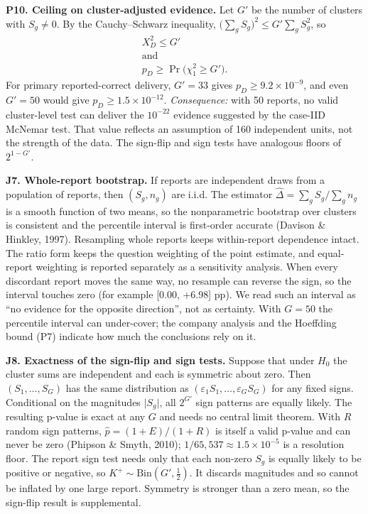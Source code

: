 \documentclass[letterpaper]{article}
\begin{document}
\textbf{P10. Ceiling on cluster-adjusted evidence.} Let \(G'\) be the number of clusters with \(S_g\neq0\). By the Cauchy--Schwarz inequality, \(\big(\sum_gS_g\big)^2\le G'\sum_gS_g^2\), so \[\begin{gathered}X^2_D\le G'\\\text{and}\\ p_D\ge\Pr\big(\chi^2_1\ge G'\big).\end{gathered}\] For primary reported-correct delivery, \(G'=33\) gives \(p_D\ge9.2\times10^{-9}\), and even \(G'=50\) would give \(p_D\ge1.5\times10^{-12}\). \emph{Consequence:} with 50 reports, no valid cluster-level test can deliver the \(10^{-22}\) evidence suggested by the case-IID McNemar test. That value reflects an assumption of 160 independent units, not the strength of the data. The sign-flip and sign tests have analogous floors of \(2^{1-G'}\).

\textbf{J7. Whole-report bootstrap.} If reports are independent draws from a population of reports, then \((S_g,n_g)\) are i.i.d. The estimator \(\hat\Delta=\sum_gS_g/\sum_gn_g\) is a smooth function of two means, so the nonparametric bootstrap over clusters is consistent and the percentile interval is first-order accurate (Davison \& Hinkley, 1997). Resampling whole reports keeps within-report dependence intact. The ratio form keeps the question weighting of the point estimate, and equal-report weighting is reported separately as a sensitivity analysis. When every discordant report moves the same way, no resample can reverse the sign, so the interval touches zero (for example {[}0.00, +6.98{]} pp). We read such an interval as ``no evidence for the opposite direction'', not as certainty. With \(G=50\) the percentile interval can under-cover; the company analysis and the Hoeffding bound (P7) indicate how much the conclusions rely on it.

\textbf{J8. Exactness of the sign-flip and sign tests.} Suppose that under \(H_0\) the cluster sums are independent and each is symmetric about zero. Then \((S_1,\dots,S_G)\) has the same distribution as \((\varepsilon_1S_1,\dots,\varepsilon_GS_G)\) for any fixed signs. Conditional on the magnitudes \(\lvert S_g\rvert\), all \(2^{G'}\) sign patterns are equally likely. The resulting p-value is exact at any \(G\) and needs no central limit theorem. With \(R\) random sign patterns, \(\hat p=(1+E)/(1+R)\) is itself a valid p-value and can never be zero (Phipson \& Smyth, 2010); \(1/65{,}537\approx1.5\times10^{-5}\) is a resolution floor. The report sign test needs only that each non-zero \(S_g\) is equally likely to be positive or negative, so \(K^+\sim\mathrm{Bin}(G',\tfrac12)\). It discards magnitudes and so cannot be inflated by one large report. Symmetry is stronger than a zero mean, so the sign-flip result is supplemental.
\end{document}
